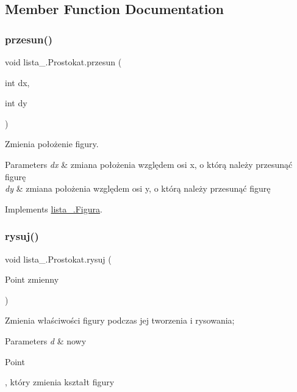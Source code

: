 \subsection{Member Function Documentation}
\mbox{\label{classlista__5_1_1_prostokat_a9e8a5112287441debbfe24165a24d322}} 
\subsubsection{\texorpdfstring{przesun()}{przesun()}}
{\footnotesize\ttfamily void lista\+\_.\+Prostokat.\+przesun (\begin{DoxyParamCaption}\item[{int}]{dx,  }\item[{int}]{dy }\end{DoxyParamCaption})}

Zmienia położenie figury. 
\begin{DoxyParams}{Parameters}
{\em dx} & zmiana położenia względem osi x, o którą należy przesunąć figurę \\
\hline
{\em dy} & zmiana położenia względem osi y, o którą należy przesunąć figurę\\
\hline
\end{DoxyParams}
 

Implements \mbox{\hyperlink{interfacelista__5_1_1_figura_a72f085618cf604e8b1632ea733043861}{lista\+\_.\+Figura}}.

\mbox{\label{classlista__5_1_1_prostokat_a63b2bb7a2b3fd86e21d0d125f4262f39}} 
\subsubsection{\texorpdfstring{rysuj()}{rysuj()}}
{\footnotesize\ttfamily void lista\+\_.\+Prostokat.\+rysuj (\begin{DoxyParamCaption}\item[{Point}]{zmienny }\end{DoxyParamCaption})}

Zmienia właściwości figury podczas jej tworzenia i rysowania; 
\begin{DoxyParams}{Parameters}
{\em d} & nowy
\begin{DoxyCode}
Point 
\end{DoxyCode}
 , który zmienia kształt figury\\
\hline
\end{DoxyParams}
 
